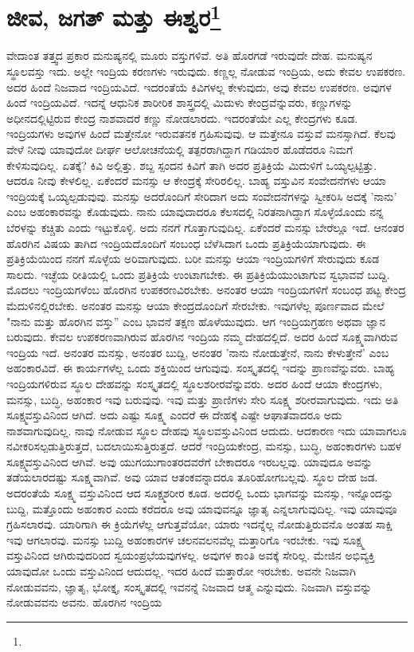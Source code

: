 
\chapter{ಜೀವ, ಜಗತ್ ಮತ್ತು ಈಶ್ವರ\protect\footnote{}}

ವೇದಾಂತ ತತ್ತ್ವದ ಪ್ರಕಾರ ಮನುಷ್ಯನಲ್ಲಿ ಮೂರು ವಸ್ತುಗಳಿವೆ. ಅತಿ ಹೊರಗಡೆ ಇರುವುದೇ ದೇಹ. ಮನುಷ್ಯನ ಸ್ಥೂಲವಸ್ತು ಇದು. ಅಲ್ಲೇ ಇಂದ್ರಿಯ ಕರಣಗಳು ಇರುವುದು. ಕಣ್ಣಲ್ಲ ನೋಡುವ ಇಂದ್ರಿಯ, ಅದು ಕೇವಲ ಉಪಕರಣ. ಅದರ ಹಿಂದೆ ನಿಜವಾದ ಇಂದ್ರಿಯವಿದೆ. ಇದರಂತೆಯೆ ಕಿವಿಗಳಲ್ಲ ಕೇಳುವುದು, ಅವು ಕೇವಲ ಉಪಕರಣ. ಅವುಗಳ ಹಿಂದೆ ಇಂದ್ರಿಯವಿದೆ. ಇದನ್ನೆ ಆಧುನಿಕ ಶಾರೀರಿಕ ಶಾಸ್ತ್ರದಲ್ಲಿ ಮಿದುಳು ಕೇಂದ್ರವೆನ್ನುವರು, ಕಣ್ಣುಗಳನ್ನು ಅಧೀನದಲ್ಲಿಟ್ಟಿರುವ ಕೇಂದ್ರ ನಾಶವಾದರೆ ಕಣ್ಣು ನೋಡಲಾರದು. ಇದರಂತೆಯೇ ಎಲ್ಲ ಕೇಂದ್ರಗಳು ಕೂಡ. ಇಂದ್ರಿಯಗಳು ಅವುಗಳ ಹಿಂದೆ ಮತ್ತೇನೋ ಇರುವತನಕ ಗ್ರಹಿಸುವುವು. ಆ ಮತ್ತೇನೂ ವಸ್ತುವೆ ಮನಸ್ಸಾಗಿದೆ. ಕೆಲವು ವೇಳೆ ನೀವು ಯಾವುದೋ ದೀರ್ಘ ಆಲೋಚನೆಯಲ್ಲಿ ತತ್ಪರರಾಗಿದ್ದಾಗ ಗಡಿಯಾರ ಹೊಡೆದರೂ ನಿಮಗೆ ಕೇಳಿಸುವುದಿಲ್ಲ. ಏತಕ್ಕೆ? ಕಿವಿ ಅಲ್ಲಿತ್ತು. ಶಬ್ದ ಸ್ಪಂದನ ಕಿವಿಗೆ ತಾಗಿ ಅದರ ಪ್ರತಿಕ್ರಿಯೆ ಮಿದುಳಿಗೆ ಒಯ್ಯಲ್ಪಟ್ಟಿತ್ತು. ಆದರೂ ನೀವು ಕೇಳಲಿಲ್ಲ. ಏಕೆಂದರೆ ಮನಸ್ಸು ಆ ಕೇಂದ್ರಕ್ಕೆ ಸೇರಿರಲಿಲ್ಲ. ಬಾಹ್ಯ ವಸ್ತುವಿನ ಸಂವೇದನೆಗಳು ಆಯಾ ಇಂದ್ರಿಯಕ್ಕೆ ಒಯ್ಯಲ್ಪಡುವುವು. ಮನಸ್ಸು ಅದರೊಂದಿಗೆ ಸೇರಿದಾಗ ಅದು ಸಂವೇದನೆಗಳನ್ನು ಸ್ವೀಕರಿಸಿ ಅದಕ್ಕೆ 'ನಾನು' ಎಂಬ ಅಹಂಕಾರವನ್ನು ಕೊಡುವುದು. ನಾನು ಯಾವುದಾದರೂ ಕೆಲಸದಲ್ಲಿ ನಿರತನಾಗಿದ್ದಾಗ ಸೊಳ್ಳೆಯೊಂದು ನನ್ನ ಬೆರಳನ್ನು ಕಚ್ಚಿತು ಎಂದು ಇಟ್ಟುಕೊಳ್ಳಿ. ಅದು ನನಗೆ ಗೊತ್ತಾಗುವುದಿಲ್ಲ. ಏಕೆಂದರೆ ಮನಸ್ಸು ಬೇರೆಲ್ಲೂ ಇದೆ. ಆನಂತರ ಹೊರಗಿನ ವಿಷಯ ತಾಗಿದ ಇಂದ್ರಿಯದೊಂದಿಗೆ ಸಂಬಂಧ ಬೆಳೆಸಿದಾಗ ಒಂದು ಪ್ರತಿಕ್ರಿಯೆಯಾಗುವುದು. ಈ ಪ್ರತಿಕ್ರಿಯೆಯಿಂದ ನನಗೆ ಸೊಳ್ಳೆಯ ಅರಿವಾಗುವುದು. ಬರೀ ಮನಸ್ಸು ಆಯಾ ಇಂದ್ರಿಯಗಳಿಗೆ ಸೇರುವುದು ಕೂಡ ಸಾಲದು. ಇಚ್ಛೆಯ ರೀತಿಯಲ್ಲಿ ಒಂದು ಪ್ರತಿಕ್ರಿಯೆ ಉಂಟಾಗಬೇಕು. ಈ ಪ್ರತಿಕ್ರಿಯೆಯುಂಟಾಗುವ ಸ್ವಭಾವವೆ ಬುದ್ದಿ. ಮೊದಲು ಇಂದ್ರಿಯಗಳೆಂಬ ಹೊರಗಿನ ಉಪಕರಣವಿರಬೇಕು. ಅನಂತರ ಆಯಾ ಇಂದ್ರಿಯಗಳಿಗೆ ಸಂಬಂಧ ಪಟ್ಟ ಕೇಂದ್ರ ಮೆದುಳಿನಲ್ಲಿರಬೇಕು. ಅನಂತರ ಮನಸ್ಸು ಆಯಾ ಕೇಂದ್ರದೊಂದಿಗೆ ಸೇರಬೇಕು. ಇವುಗಳೆಲ್ಲ ಪೂರ್ಣವಾದ ಮೇಲೆ "ನಾನು ಮತ್ತು ಹೊರಗಿನ ವಸ್ತು” ಎಂಬ ಭಾವನೆ ತಕ್ಷಣ ಹೊಳೆಯುವುದು. ಆಗ ಇಂದ್ರಿಯಗ್ರಹಣ ಅಥವಾ ಜ್ಞಾನ ಬರುವುದು. ಕೇವಲ ಉಪಕರಣವಾಗಿರುವ ಹೊರಗಿನ ಇಂದ್ರಿಯ ನಮ್ಮ ದೇಹದಲ್ಲಿದೆ. ಅದರ ಹಿಂದೆ ಸೂಕ್ಷ್ಮವಾಗಿರುವ ಇಂದ್ರಿಯ ಇದೆ. ಅನಂತರ ಮನಸ್ಸು, ಅನಂತರ ಬುದ್ದಿ, ಅನಂತರ 'ನಾನು ನೋಡುತ್ತೇನೆ, ನಾನು ಕೇಳುತ್ತೇನೆ' ಎಂಬ ಅಹಂಕಾರವಿದೆ. ಈ ಕಾರ್ಯಗಳೆಲ್ಲ ಒಂದು ಶಕ್ತಿಯಿಂದ ಆಗುವುವು. ಸಂಸ್ಕೃತದಲ್ಲಿ ಇದನ್ನು ಪ್ರಾಣವೆನ್ನುವರು. ಬಾಹ್ಯ ಇಂದ್ರಿಯಗಳಿರುವ ಸ್ಥೂಲ ದೇಹವನ್ನು ಸಂಸ್ಕೃತದಲ್ಲಿ ಸ್ಥೂಲಶರೀರವೆನ್ನುವರು. ಅದರ ಹಿಂದೆ ಆಯಾ ಕೇಂದ್ರಗಳು, ಮನಸ್ಸು, ಬುದ್ಧಿ, ಅಹಂಕಾರ ಇವು ಬರುವುವು. ಇವು ಮತ್ತು ಪ್ರಾಣಿಗಳು ಸೇರಿ ಸೂಕ್ಷ್ಮ ಶರೀರವಾಗುವುದು. ಇದು ಅತಿ ಸೂಕ್ಷ್ಮವಸ್ತುವಿನಿಂದ ಆಗಿದೆ. ಅದು ಎಷ್ಟು ಸೂಕ್ಷ್ಮ ಎಂದರೆ ಈ ದೇಹಕ್ಕೆ ಎಷ್ಟೇ ಆಘಾತವಾದರೂ ಅದು ನಾಶವಾಗುವುದಿಲ್ಲ. ನಾವು ನೋಡುವ ಸ್ಥೂಲ ದೇಹವು ಸ್ಥೂಲವಸ್ತುವಿನಿಂದ ಆದುದು. ಆದಕಾರಣ ಇದು ಯಾವಾಗಲೂ ನವೀಕರಿಸಲ್ಪಡುತ್ತಿರುತ್ತದೆ, ಬದಲಾಯಿಸುತ್ತಿರುತ್ತದೆ. ಆದರೆ ಇಂದ್ರಿಯಕೇಂದ್ರ, ಮನಸ್ಸು, ಬುದ್ಧಿ, ಅಹಂಕಾರಗಳು ಬಹಳ ಸೂಕ್ಷ್ಮವಸ್ತುವಿನಿಂದ ಆಗಿವೆ. ಅವು ಯುಗಯುಗಾಂತರದವರೆಗೆ ಬೇಕಾದರೂ ಇರಬಲ್ಲವು. ಯಾವುದೂ ಅವನ್ನು ತಡೆಯಲಾರದಷ್ಟು ಸೂಕ್ಷ್ಮವಾಗಿವೆ. ಅವು ಯಾವ ಆತಂಕವನ್ನಾದರೂ ತೂರಿಹೋಗಬಲ್ಲವು. ಸ್ಥೂಲ ದೇಹ ಜಡ. ಅದರಂತೆಯೆ ಸೂಕ್ಷ್ಮ ವಸ್ತುವಿನಿಂದ ಆದ ಸೂಕ್ಷ್ಮಶರೀರ ಕೂಡ. ಅದರಲ್ಲಿ ಒಂದು ಭಾಗವನ್ನು ಮನಸ್ಸು, ಇನ್ನೊಂದನ್ನು ಬುದ್ದಿ, ಮತ್ತೊಂದು ಅಹಂಕಾರ ಎಂದು ಕರೆದರೂ ಅವು ಯಾವುವನ್ನೂ ಜ್ಞಾತೃ ಎನ್ನಲಾಗುವುದಿಲ್ಲ. ಇವು ಯಾವುವೂ ಗ್ರಹಿಸಲಾರವು. ಯಾರಿಗಾಗಿ ಈ ಕ್ರಿಯೆಗಳೆಲ್ಲ ಆಗುತ್ತವೆಯೋ, ಯಾರು ಇದನ್ನೆಲ್ಲ ನೋಡುತ್ತಿರುವನೊ ಅಂತಹ ಸಾಕ್ಷಿ ಇವು ಆಗಲಾರವು. ಮನಸ್ಸು ಬುದ್ದಿ ಅಹಂಕಾರಗಳ ಚಲನವಲನವೆಲ್ಲ ಮತ್ತಾರಿಗೊ ಇರಬೇಕು. ಇವು ಸೂಕ್ಷ್ಮ ವಸ್ತುವಿನಿಂದ ಆಗಿರುವುದರಿಂದ ಸ್ವಯಂಪ್ರಭೆಯವುಗಳಲ್ಲ. ಅವುಗಳ ಕಾಂತಿ ಅವಕ್ಕೆ ಸೇರಿಲ್ಲ. ಮೇಜಿನ ಅಭಿವ್ಯಕ್ತಿ ಯಾವುದೋ ಒಂದು ವಸ್ತುವಿನಿಂದ ಆದುದಲ್ಲ. ಇದರ ಹಿಂದೆ ಮತ್ತಾರೋ ಇರಬೇಕು. ಅವನೇ ನಿಜವಾಗಿ ನೋಡುವವನು, ಜ್ಞಾತೃ, ಭೋಕ್ತೃ, ಸಂಸ್ಕೃತದಲ್ಲಿ ಇವನನ್ನೆ ನಿಜವಾದ ಆತ್ಮ ಎನ್ನುವುದು. ನಿಜವಾಗಿ ವಸ್ತುವನ್ನು ನೋಡುವವನು ಅವನು. ಹೊರಗಿನ ಇಂದ್ರಿಯ 